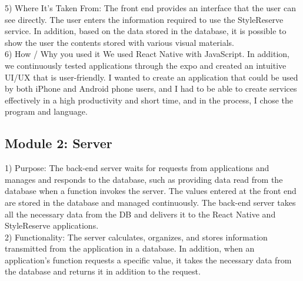 \documentclass[conference]{IEEEtran}
\begin{document}
5) Where It’s Taken From: The front end provides an interface that the user can see directly. The user enters the information required to use the StyleReserve service. In addition, based on the data stored in the database, it is possible to show the user the contents stored with various visual materials.\\

6) How / Why you used it
We used React Native with JavaScript. In addition, we continuously tested applications through the expo and created an intuitive UI/UX that is user-friendly. I wanted to create an application that could be used by both iPhone and Android phone users, and I had to be able to create services effectively in a high productivity and short time, and in the process, I chose the program and language.\\


\subsection{Module 2: Server}
1) Purpose: The back-end server waits for requests from applications and manages and responds to the database, such as providing data read from the database when a function invokes the server. The values entered at the front end are stored in the database and managed continuously. The back-end server takes all the necessary data from the DB and delivers it to the React Native and StyleReserve applications.\\

2) Functionality: The server calculates, organizes, and stores information transmitted from the application in a database. In addition, when an application's function requests a specific value, it takes the necessary data from the database and returns it in addition to the request.\\
\end{document}
